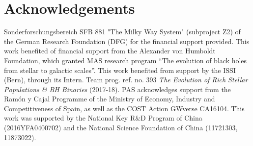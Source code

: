 \documentclass[twocolumn]{aastex62}
\begin{document}
\begin{itemize}
\end{itemize}

\section*{Acknowledgements}

Sonderforschungsbereich SFB 881 "The Milky Way System" (subproject Z2) of the
German Research Foundation (DFG) for the financial support provided. This work
benefited of financial support from the Alexander von Humboldt Foundation,
which granted MAS research program ``The evolution of black holes from stellar
to galactic scales''.  This work benefited from support by the ISSI (Bern),
through its Intern. Team prog. ref. no. 393 {\it The Evolution of Rich Stellar
Populations \& BH Binaries} (2017-18).  PAS acknowledges support from the
Ram{\'o}n y Cajal Programme of the Ministry of Economy, Industry and
Competitiveness of Spain, as well as the COST Action GWverse CA16104. This work
was supported by the National Key R\&D Program of China (2016YFA0400702) and
the National Science Foundation of China (11721303, 11873022).

\footnotesize{


}
\end{document}
